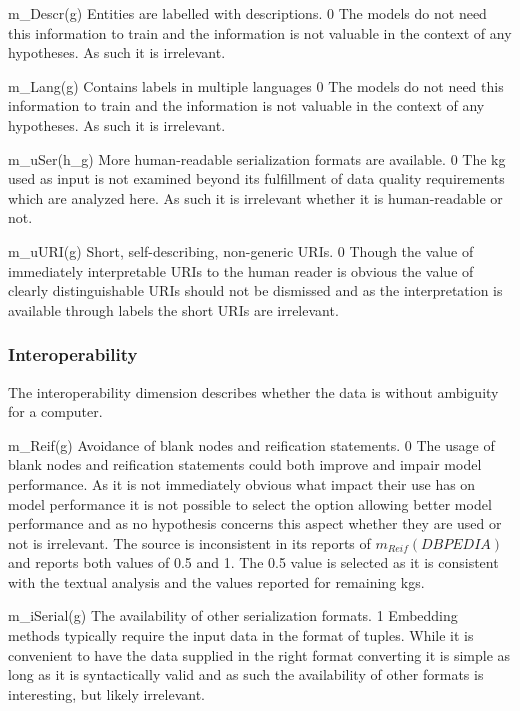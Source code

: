 \weighttable
{m_{Descr}(g)}
{Entities are labelled with descriptions.}
{0}
{The models do not need this information to train and the information is not valuable in the context of any hypotheses. As such it is irrelevant.}
{}

\weighttable
{m_{Lang}(g)}
{Contains labels in multiple languages}
{0}
{The models do not need this information to train and the information is not valuable in the context of any hypotheses. As such it is irrelevant.}
{}

\weighttable
{m_{uSer}(h_g)}
{More human-readable serialization formats are available.}
{0}
{The \gls{kg} used as input is not examined beyond its fulfillment of data quality requirements which are analyzed here. As such it is irrelevant whether it is human-readable or not.}
{}

\weighttable
{m_{uURI}(g)}
{Short, self-describing, non-generic URIs.}
{0}
{Though the value of immediately interpretable URIs to the human reader is obvious the value of clearly distinguishable URIs should not be dismissed and as the interpretation is available through labels the short URIs are irrelevant.}
{}

\subsubsection{Interoperability}
The interoperability dimension describes whether the data is without ambiguity for a computer.

\weighttable
{m_{Reif}(g)}
{Avoidance of blank nodes and reification statements.}
{0}
{The usage of blank nodes and reification statements could both improve and impair model performance. As it is not immediately obvious what impact their use has on model performance it is not possible to select the option allowing better model performance and as no hypothesis concerns this aspect whether they are used or not is irrelevant.}
{The source is inconsistent in its reports of $m_{Reif}(DBPEDIA)$ and reports both values of 0.5 and 1. The 0.5 value is selected as it is consistent with the textual analysis and the values reported for remaining \glspl{kg}.}

\weighttable
{m_{iSerial}(g)}
{The availability of other serialization formats.}
{1}
{Embedding methods typically require the input data in the format of tuples. While it is convenient to have the data supplied in the right format converting it is simple as long as it is syntactically valid and as such the availability of other formats is interesting, but likely irrelevant.}
{}

